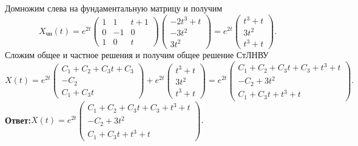\documentclass[a4paper, 12pt]{article}
\begin{document}
Домножим слева на фундаментальную матрицу и получим
$$X_{\text{чн}}(t) = e^{2t}\begin{pmatrix}
	1 & 1 & t+1\\
	0 & -1 & 0\\
	1 & 0 & t
\end{pmatrix}\begin{pmatrix}
-2t^3 + t\\
-3t^2\\
3t^2
\end{pmatrix} = e^{2t}\begin{pmatrix}
t^3 + t\\
3t^2\\
t^3 + t
\end{pmatrix}.$$
Сложим общее и частное решения и получим общее решение СтЛНВУ
$$X(t) =e^{2t}\begin{pmatrix}
	C_1 + C_2 + C_3t + C_3\\
	-C_2\\
	C_1 + C_3t
\end{pmatrix} + e^{2t}\begin{pmatrix}
t^3 + t\\
3t^2\\
t^3 + t
\end{pmatrix} = e^{2t}\begin{pmatrix}
C_1 + C_2 + C_3t + C_3 + t^3 + t\\
-C_2 + 3t^2\\
C_1 + C_3t + t^3 + t
\end{pmatrix}.$$
\textbf{Ответ:}$X(t) = e^{2t}\begin{pmatrix}
	C_1 + C_2 + C_3t + C_3 + t^3 + t\\
	-C_2 + 3t^2\\
	C_1 + C_3t + t^3 + t
\end{pmatrix}.$
\end{document}
